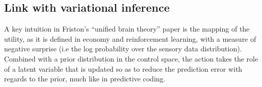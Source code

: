 \documentclass[runningheads]{llncs}
\begin{document}






\subsection{Link with variational inference}
A key intuition in Friston's  ``unified brain theory'' paper \cite{friston2010free} is the mapping of the utility, as it is defined in economy and reinforcement learning, with a measure of negative surprise (i.e the log probability over the sensory data distribution). Combined with a prior distribution in the control space, the action takes the role of a latent variable that is updated so as to reduce the prediction error with regards to the prior, much like in predictive coding. 
\end{document}
